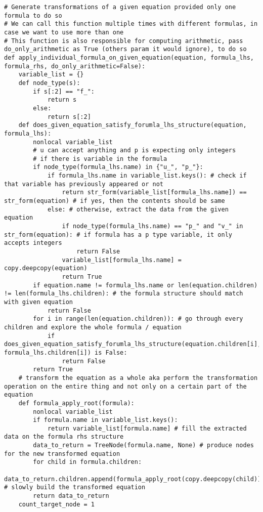 \documentclass{book}
\begin{document}
\begin{lstlisting}[style=mystyle, caption={main.py}, label={lst:python_code}]
# Generate transformations of a given equation provided only one formula to do so
# We can call this function multiple times with different formulas, in case we want to use more than one
# This function is also responsible for computing arithmetic, pass do_only_arithmetic as True (others param it would ignore), to do so
def apply_individual_formula_on_given_equation(equation, formula_lhs, formula_rhs, do_only_arithmetic=False):
    variable_list = {}
    def node_type(s):
        if s[:2] == "f_":
            return s
        else:
            return s[:2]
    def does_given_equation_satisfy_forumla_lhs_structure(equation, formula_lhs):
        nonlocal variable_list
        # u can accept anything and p is expecting only integers
        # if there is variable in the formula
        if node_type(formula_lhs.name) in {"u_", "p_"}: 
            if formula_lhs.name in variable_list.keys(): # check if that variable has previously appeared or not
                return str_form(variable_list[formula_lhs.name]) == str_form(equation) # if yes, then the contents should be same
            else: # otherwise, extract the data from the given equation
                if node_type(formula_lhs.name) == "p_" and "v_" in str_form(equation): # if formula has a p type variable, it only accepts integers
                    return False
                variable_list[formula_lhs.name] = copy.deepcopy(equation)
                return True
        if equation.name != formula_lhs.name or len(equation.children) != len(formula_lhs.children): # the formula structure should match with given equation
            return False
        for i in range(len(equation.children)): # go through every children and explore the whole formula / equation
            if does_given_equation_satisfy_forumla_lhs_structure(equation.children[i], formula_lhs.children[i]) is False:
                return False
        return True
    # transform the equation as a whole aka perform the transformation operation on the entire thing and not only on a certain part of the equation
    def formula_apply_root(formula):
        nonlocal variable_list
        if formula.name in variable_list.keys():
            return variable_list[formula.name] # fill the extracted data on the formula rhs structure
        data_to_return = TreeNode(formula.name, None) # produce nodes for the new transformed equation
        for child in formula.children:
            data_to_return.children.append(formula_apply_root(copy.deepcopy(child))) # slowly build the transformed equation
        return data_to_return
    count_target_node = 1

\end{lstlisting}
\end{document}
